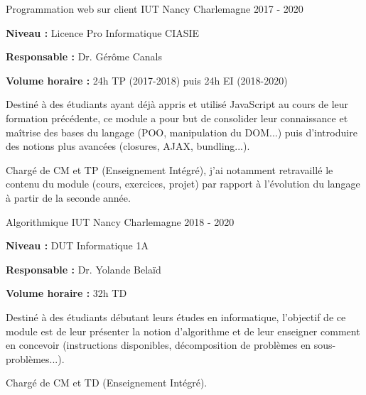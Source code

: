 \documentclass[12pt, a4paper]{awesome-cv}
\begin{document}
\begin{cventries}
  \cventry
  {Programmation web sur client} %
  {IUT Nancy Charlemagne} %
  {} %
  {2017 - 2020} %
  {
    \begin{cvitems}
      \item {\textbf{Niveau : } Licence Pro Informatique CIASIE}
      \item {\textbf{Responsable : } Dr. Gérôme Canals}
      \item {\textbf{Volume horaire : } 24h TP (2017-2018) puis 24h EI (2018-2020)}
    \end{cvitems}
  }

  \begin{cvparagraph}
    Destiné à des étudiants ayant déjà appris et utilisé JavaScript au cours de leur formation précédente, ce module a pour but de consolider leur connaissance et maîtrise des bases du langage (POO, manipulation du DOM...) puis d'introduire des notions plus avancées (closures, AJAX, bundling...).
  \end{cvparagraph}

  \begin{cvparagraph}
    Chargé de CM et TP (Enseignement Intégré), j'ai notamment retravaillé le contenu du module (cours, exercices, projet) par rapport à l'évolution du langage à partir de la seconde année.
  \end{cvparagraph}

  \cventry
  {Algorithmique} %
  {IUT Nancy Charlemagne} %
  {} %
  {2018 - 2020} %
  {
    \begin{cvitems}
      \item {\textbf{Niveau : } DUT Informatique 1A}
      \item {\textbf{Responsable : } Dr. Yolande Belaïd}
      \item {\textbf{Volume horaire : } 32h TD}
    \end{cvitems}
  }

  \begin{cvparagraph}
    Destiné à des étudiants débutant leurs études en informatique, l'objectif de ce module est de leur présenter la notion d'algorithme et de leur enseigner comment en concevoir (instructions disponibles, décomposition de problèmes en sous-problèmes...).
  \end{cvparagraph}

  \begin{cvparagraph}
    Chargé de CM et TD (Enseignement Intégré).
  \end{cvparagraph}


\end{cventries}
\end{document}
